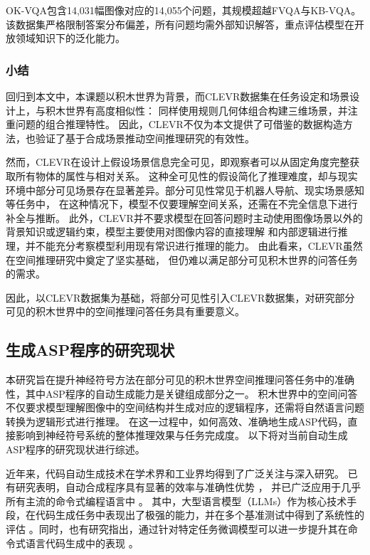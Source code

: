 OK-VQA\cite{marino2019ok}包含14,031幅图像对应的14,055个问题，其规模超越FVQA与KB-VQA。该数据集严格限制答案分布偏差，所有问题均需外部知识解答，重点评估模型在开放领域知识下的泛化能力。
\subsubsection{小结}


回归到本文中，本课题以积木世界为背景，而CLEVR数据集在任务设定和场景设计上，与积木世界有高度相似性：
同样使用规则几何体组合构建三维场景，并注重问题的组合推理特性。
因此，CLEVR不仅为本文提供了可借鉴的数据构造方法，也验证了基于合成场景推动空间推理研究的有效性。

然而，CLEVR在设计上假设场景信息完全可见，即观察者可以从固定角度完整获取所有物体的属性与相对关系。
这种全可见性的假设简化了推理难度，却与现实环境中部分可见场景存在显著差异。部分可见性常见于机器人导航、现实场景感知等任务中，
在这种情况下，模型不仅要理解空间关系，还需在不完全信息下进行补全与推断。
此外，CLEVR并不要求模型在回答问题时主动使用图像场景以外的背景知识或逻辑约束，模型主要使用对图像内容的直接理解
和内部逻辑进行推理，并不能充分考察模型利用现有常识进行推理的能力。
由此看来，CLEVR虽然在空间推理研究中奠定了坚实基础，
但仍难以满足部分可见积木世界的问答任务的需求。

因此，以CLEVR数据集为基础，将部分可见性引入CLEVR数据集，对研究部分可见的积木世界中的空间推理问答任务具有重要意义。
\subsection{生成ASP程序的研究现状}
本研究旨在提升神经符号方法在部分可见的积木世界空间推理问答任务中的准确性，其中ASP程序的自动生成能力是关键组成部分之一。
积木世界中的空间问答不仅要求模型理解图像中的空间结构并生成对应的逻辑程序，还需将自然语言问题转换为逻辑形式进行推理。
在这一过程中，如何高效、准确地生成ASP代码，直接影响到神经符号系统的整体推理效果与任务完成度。
以下将对当前自动生成ASP程序的研究现状进行综述。

近年来，代码自动生成技术在学术界和工业界均得到了广泛关注与深入研究。
已有研究表明，自动合成程序具有显著的效率与准确性优势 \cite{ernst2022ai}\cite{peng2023impact}\cite{dakhel2023github}，
并已广泛应用于几乎所有主流的命令式编程语言中 \cite{chen2021evaluating}。
其中，大型语言模型（LLMs）作为核心技术手段，在代码生成任务中表现出了极强的能力，并在多个基准测试中得到了系统性的评估 \cite{xu2022systematic}\cite{wang2023codet5+}。同时，也有研究指出，通过针对特定任务微调模型可以进一步提升其在命令式语言代码生成中的表现 \cite{ma2024llamoco}。

